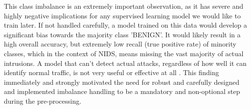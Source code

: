 This class imbalance is an extremely important observation, as it has severe and highly negative implications for any supervised learning model we would like to train later. If not handled carefully, a model trained on this data would develop a significant bias towards the majority class 'BENIGN'. It would likely result in a high overall accuracy, but extremely low recall (true positive rate) of minority classes, which in the context of NIDS, means missing the vast majority of actual intrusions. A model that can't detect actual attacks, regardless of how well it can identify normal traffic, is not very useful or effective at all \parencite{aldhubaib2024network}. This finding immediately and strongly motivated the need for robust and carefully designed and implemented imbalance handling to be a mandatory and non-optional step during the pre-processing.

